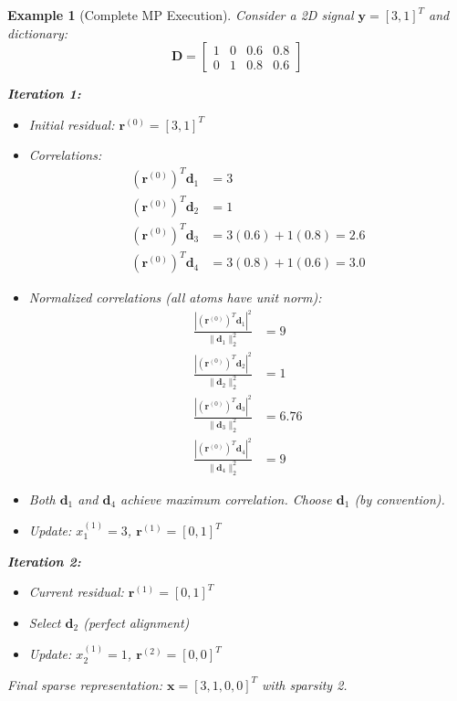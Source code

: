 \documentclass[12pt]{article}
\newtheorem{example}[theorem]{Example}
\begin{document}
\begin{example}[Complete MP Execution]\label{ex:complete_mp}
    Consider a 2D signal $\mathbf{y} = [3, 1]^T$ and dictionary:
    \begin{equation}
        \mathbf{D} = \begin{bmatrix} 1 & 0 & 0.6 & 0.8 \\ 0 & 1 & 0.8 & 0.6 \end{bmatrix}
    \end{equation}

    \textbf{Iteration 1:}
    \begin{itemize}
        \item Initial residual: $\mathbf{r}^{(0)} = [3, 1]^T$
        \item Correlations:
              \begin{align}
                  (\mathbf{r}^{(0)})^T \mathbf{d}_1 & = 3                     \\
                  (\mathbf{r}^{(0)})^T \mathbf{d}_2 & = 1                     \\
                  (\mathbf{r}^{(0)})^T \mathbf{d}_3 & = 3(0.6) + 1(0.8) = 2.6 \\
                  (\mathbf{r}^{(0)})^T \mathbf{d}_4 & = 3(0.8) + 1(0.6) = 3.0
              \end{align}
        \item Normalized correlations (all atoms have unit norm):
              \begin{align}
                  \frac{|(\mathbf{r}^{(0)})^T \mathbf{d}_1|^2}{\|\mathbf{d}_1\|_2^2} & = 9    \\
                  \frac{|(\mathbf{r}^{(0)})^T \mathbf{d}_2|^2}{\|\mathbf{d}_2\|_2^2} & = 1    \\
                  \frac{|(\mathbf{r}^{(0)})^T \mathbf{d}_3|^2}{\|\mathbf{d}_3\|_2^2} & = 6.76 \\
                  \frac{|(\mathbf{r}^{(0)})^T \mathbf{d}_4|^2}{\|\mathbf{d}_4\|_2^2} & = 9
              \end{align}
        \item Both $\mathbf{d}_1$ and $\mathbf{d}_4$ achieve maximum correlation. Choose $\mathbf{d}_1$ (by convention).
        \item Update: $x_1^{(1)} = 3$, $\mathbf{r}^{(1)} = [0, 1]^T$
    \end{itemize}

    \textbf{Iteration 2:}
    \begin{itemize}
        \item Current residual: $\mathbf{r}^{(1)} = [0, 1]^T$
        \item Select $\mathbf{d}_2$ (perfect alignment)
        \item Update: $x_2^{(1)} = 1$, $\mathbf{r}^{(2)} = [0, 0]^T$
    \end{itemize}

    Final sparse representation: $\mathbf{x} = [3, 1, 0, 0]^T$ with sparsity 2.
\end{example}
\end{document}
